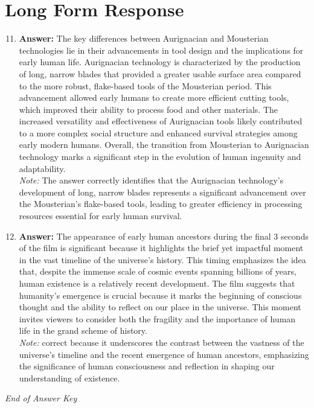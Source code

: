 \documentclass[12pt]{article}
\begin{document}
\section*{Long Form Response}
\begin{enumerate}[label=\arabic*.]
\setcounter{enumi}{10}
\item \textbf{Answer:} The key differences between Aurignacian and Mousterian technologies lie in their advancements in tool design and the implications for early human life. Aurignacian technology is characterized by the production of long, narrow blades that provided a greater usable surface area compared to the more robust, flake-based tools of the Mousterian period. This advancement allowed early humans to create more efficient cutting tools, which improved their ability to process food and other materials. The increased versatility and effectiveness of Aurignacian tools likely contributed to a more complex social structure and enhanced survival strategies among early modern humans. Overall, the transition from Mousterian to Aurignacian technology marks a significant step in the evolution of human ingenuity and adaptability.
\\ \textit{Note:} The answer correctly identifies that the Aurignacian technology's development of long, narrow blades represents a significant advancement over the Mousterian's flake-based tools, leading to greater efficiency in processing resources essential for early human survival.
\item \textbf{Answer:} The appearance of early human ancestors during the final 3 seconds of the film is significant because it highlights the brief yet impactful moment in the vast timeline of the universe's history. This timing emphasizes the idea that, despite the immense scale of cosmic events spanning billions of years, human existence is a relatively recent development. The film suggests that humanity's emergence is crucial because it marks the beginning of conscious thought and the ability to reflect on our place in the universe. This moment invites viewers to consider both the fragility and the importance of human life in the grand scheme of history.
\\ \textit{Note:} correct because it underscores the contrast between the vastness of the universe's timeline and the recent emergence of human ancestors, emphasizing the significance of human consciousness and reflection in shaping our understanding of existence.
\end{enumerate}

\vfill
\noindent\textit{End of Answer Key}
\end{document}

